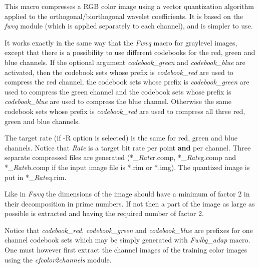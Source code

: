 This macro compresses a RGB color image using a vector quantization 
algorithm applied to the orthogonal/biorthogonal 
wavelet coefficients. 
It is based on the {\em fwvq} module (which is applied separately 
to each channel), and is simpler to use. 

It works exactly in the same way that the {\em Fwvq} macro for graylevel 
images, except that there is a possibility to use different codebooks 
for the red, green and blue channels. If the optional argument 
{\em codebook\_green} and {\em codebook\_blue} are activated, 
then the codebook sets whose prefix is {\em codebook\_red} are used 
to compress the red channel, the codebook sets whose prefix is 
{\em codebook\_green} are used to compress the green channel and 
the codebook sets whose prefix is {\em codebook\_blue} are used 
to compress the blue channel. Otherwise the same codebook sets whose prefix 
is {\em codebook\_red} are used to compress all three red, green and 
blue channels. 

The target rate (if -R option is selected) is the same for red, green and 
blue channels. Notice that {\em Rate} is a target bit rate per point {\bf and} 
per channel. Three separate compressed files are generated 
(*\_{\em Rate}r.comp, *\_{\em Rate}g.comp and *\_{\em Rate}b.comp 
if the input image file is *.rim or *.img). 
The quantized image is put in *\_{\em Rate}q.rim. 

Like in {\em Fwvq} the dimensions of the image should have a minimum 
of factor 2 in their decomposition in prime numbers. If not then a part of the 
image as large as possible is extracted and having the required 
number of factor 2. 

Notice that {\em codebook\_red}, {\em codebook\_green} 
and {\em codebook\_blue} are prefixes for one channel codebook sets 
which may be simply generated with {\em Fwlbg\_adap} macro. 
One must however first extract the channel images of the training color 
images using the {\em cfcolor2channels} module.
